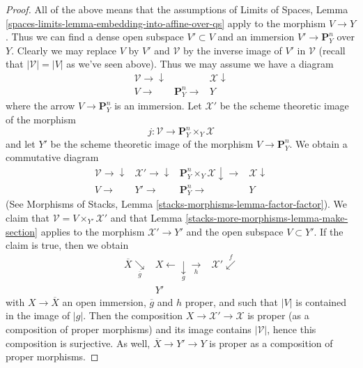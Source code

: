 \begin{proof}
\medskip\noindent
All of the above means that the assumptions of
Limits of Spaces, Lemma \ref{spaces-limits-lemma-embedding-into-affine-over-qs}
apply to the morphism $V \to Y$. Thus we can find a dense open
subspace $V' \subset V$ and an immersion $V' \to \mathbf{P}^n_Y$
over $Y$. Clearly we may replace $V$ by $V'$ and $\mathcal{V}$
by the inverse image of $V'$ in $\mathcal{V}$ (recall that
$|\mathcal{V}| = |V|$ as we've seen above).
Thus we may assume we have a diagram
$$
\begin{array}{ccc}\mathcal{V} \longrightarrow\downarrow &  & \mathcal{X} \downarrow \\ V \longrightarrow & \mathbf{P}^n_Y \longrightarrow & Y\end{array}
$$
where the arrow $V \to \mathbf{P}^n_Y$ is an immersion.
Let $\mathcal{X}'$ be the scheme theoretic image of the morphism
$$
j : \mathcal{V} \longrightarrow \mathbf{P}^n_Y \times_Y \mathcal{X}
$$
and let $Y'$ be the scheme theoretic image of the morphism
$V \to \mathbf{P}^n_Y$. We obtain a commutative diagram
$$
\begin{array}{cccc}\mathcal{V} \longrightarrow\downarrow & \mathcal{X}' \longrightarrow\downarrow & \mathbf{P}^n_Y \times_Y \mathcal{X} \downarrow\longrightarrow & \mathcal{X} \downarrow \\ V \longrightarrow & Y' \longrightarrow & \mathbf{P}^n_Y \longrightarrow & Y\end{array}
$$
(See Morphisms of Stacks, Lemma \ref{stacks-morphisms-lemma-factor-factor}).
We claim that $\mathcal{V} = V \times_{Y'} \mathcal{X}'$ and that
Lemma \ref{stacks-more-morphisms-lemma-make-section} applies to the morphism $\mathcal{X}' \to Y'$
and the open subspace $V \subset Y'$. If the claim is true, then we obtain
$$
\begin{array}{ccc}\overline{X} \underset{\overline{g}}{\searrow} & X \longleftarrow\underset{g}{\downarrow}\underset{h}{\longrightarrow} & \mathcal{X}' \overset{f}{\swarrow} \\  & Y' & \end{array}
$$
with $X \to \overline{X}$ an open immersion, $\overline{g}$ and $h$ proper,
and such that $|V|$ is contained in the image of $|g|$.
Then the composition $X \to \mathcal{X}' \to \mathcal{X}$ is
proper (as a composition of proper morphisms) and its image
contains $|\mathcal{V}|$, hence this composition is surjective.
As well, $\overline{X} \to Y' \to Y$ is proper as a composition
of proper morphisms.


\end{proof}
